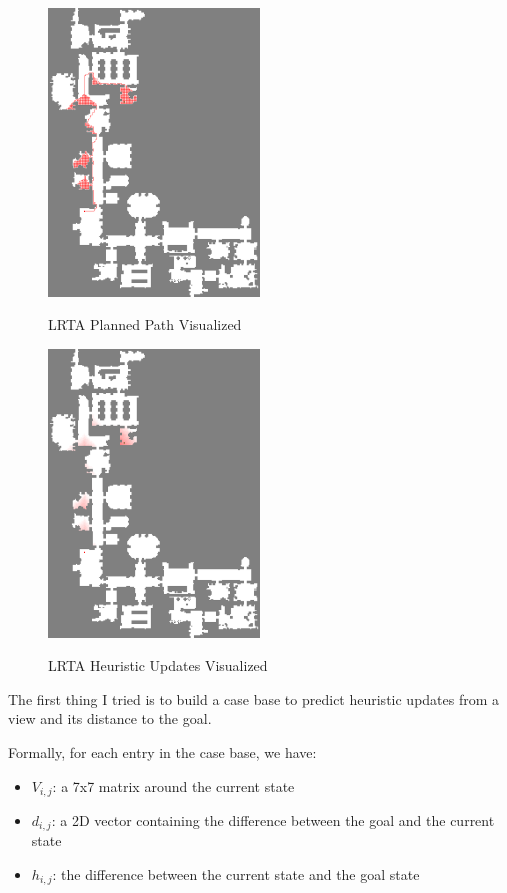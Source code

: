 \documentclass[letterpaper]{article}
\numberwithin{equation}{section}
\numberwithin{theorem}{section}
\numberwithin{lemma}{section}
\numberwithin{df}{section}
\begin{document}
    \begin{figure}[h]
        \caption {LRTA Planned Path Visualized}
        \centering
        \includegraphics[width=0.5\textwidth]{lrta_path}
        \label{fig:lrta_path}
    \end{figure}

    \begin{figure}[h]
        \caption {LRTA Heuristic Updates Visualized}
        \centering
        \includegraphics[width=0.5\textwidth]{lrta_h}
        \label{fig:lrta_h}
    \end{figure}

    The first thing I tried is to build a case base to predict heuristic updates from a view and its distance to the goal.

    Formally, for each entry in the case base, we have:
    \begin{itemize}
        \item $V_{i, j}$: a 7x7 matrix around the current state
        \item $d_{i, j}$: a 2D vector containing the difference between the goal and the current state
        \item $h_{i, j}$: the difference between the current state and the goal state
    \end{itemize}
\end{document}
